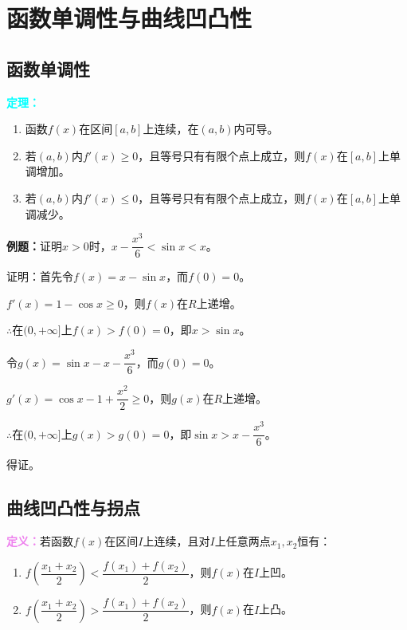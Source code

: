 \documentclass[UTF8, 12pt]{ctexart}
\begin{document}
        \section{函数单调性与曲线凹凸性}

        \subsection{函数单调性}

        \textcolor{aqua}{\textbf{定理：}}

        \begin{enumerate}
            \item 函数$f(x)$在区间$[a,b]$上连续，在$(a,b)$内可导。
            \item 若$(a,b)$内$f'(x)\geqslant 0$，且等号只有有限个点上成立，则$f(x)$在$[a,b]$上单调增加。
            \item 若$(a,b)$内$f'(x)\leqslant 0$，且等号只有有限个点上成立，则$f(x)$在$[a,b]$上单调减少。
        \end{enumerate}

        \textbf{例题：}证明$x>0$时，$x-\dfrac{x^3}{6}<\sin x<x$。

        证明：首先令$f(x)=x-\sin x$，而$f(0)=0$。

        $f'(x)=1-\cos x\geqslant 0$，则$f(x)$在$R$上递增。

        $\therefore$在$(0,+\infty]$上$f(x)>f(0)=0$，即$x>\sin x$。

        令$g(x)=\sin x-x-\dfrac{x^3}{6}$，而$g(0)=0$。

        $g'(x)=\cos x-1+\dfrac{x^2}{2}\geqslant 0$，则$g(x)$在$R$上递增。

        $\therefore$在$(0,+\infty]$上$g(x)>g(0)=0$，即$\sin x>x-\dfrac{x^3}{6}$。

        得证。

        \subsection{曲线凹凸性与拐点}

        \textcolor{violet}{\textbf{定义：}}若函数$f(x)$在区间$I$上连续，且对$I$上任意两点$x_1,x_2$恒有：

        \begin{enumerate}
            \item $f(\dfrac{x_1+x_2}{2})<\dfrac{f(x_1)+f(x_2)}{2}$，则$f(x)$在$I$上凹。
            \item $f(\dfrac{x_1+x_2}{2})>\dfrac{f(x_1)+f(x_2)}{2}$，则$f(x)$在$I$上凸。
        \end{enumerate}
\end{document}
